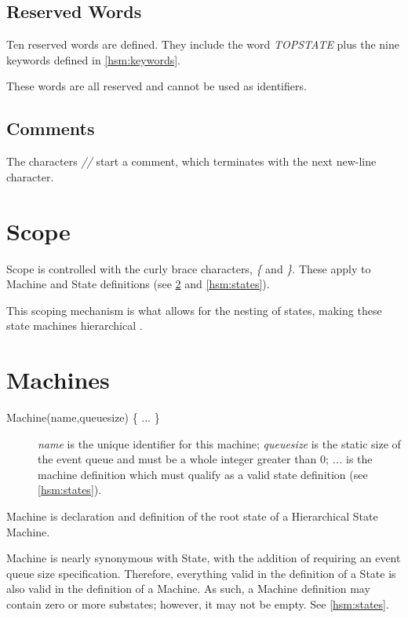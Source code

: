 \documentclass[titlepage,letterpaper]{report}
\begin{document}
\subsection{Reserved Words}
\label{hsm:reserved}

Ten reserved words are defined.  They include the word \emph{TOPSTATE} plus the nine keywords defined in \ref{hsm:keywords}.

These words are all reserved and cannot be used as identifiers.

\subsection{Comments}

The characters \emph{//} start a comment, which terminates with the next new-line character.

\section{Scope}

Scope is controlled with the curly brace characters, \emph{\{} and \emph{\}}.  These apply
to Machine and State definitions (see \ref{hsm:machines} and \ref{hsm:states}).

This scoping mechanism is what allows for the nesting of states, making these state 
machines hierarchical \cite{harel:sta}.

\section{Machines}

\label{hsm:machines}

\begin{description}
\item[Machine(name,queuesize) \{ ... \}] \emph{name} is the unique identifier for this machine; \emph{queuesize}
                                       is the static size of the event queue and must be a
																			 whole integer greater than 0; \emph{...} is the machine definition
																			 which must qualify as a valid state definition (see \ref{hsm:states}).
\end{description}

Machine is declaration and definition of the root state of a Hierarchical State Machine.  

Machine is nearly synonymous with State, with the addition of requiring an event queue size 
specification. Therefore, everything valid in the definition of a State is also valid in the definition of
a Machine.  As such, a Machine definition may contain zero or more substates; however, it may not be empty.
See \ref{hsm:states}.
\end{document}
